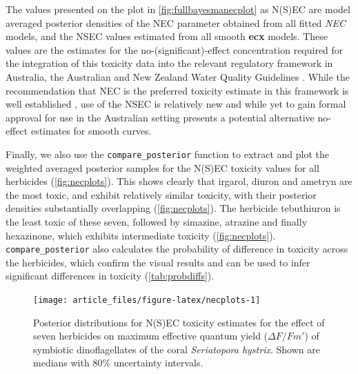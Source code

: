 \documentclass[
  shortnames]{jss}
\begin{document}
The values presented on the plot in \autoref{fig:fullbayesmanecplot} as N(S)EC are model averaged posterior densities of the NEC parameter obtained from all fitted \emph{NEC} models, and the NSEC values estimated from all smooth \textbf{ecx} models. These values are the  estimates for the no-(significant)-effect concentration required for the integration of this toxicity data into the relevant regulatory framework in Australia, the Australian and New Zealand Water Quality Guidelines \citep{anzg}. While the recommendation that NEC is the preferred toxicity estimate in this framework is well established \citep[\citet{Warne2018c}]{Warne2015}, use of the NSEC is relatively new \citep{Fisher2023} and while yet to gain formal approval for use in the Australian setting presents a potential alternative no-effect estimates for smooth curves.

Finally, we also use the \texttt{compare\_posterior} function to extract and plot the weighted averaged posterior samples for the N(S)EC toxicity values for all herbicides (\autoref{fig:necplots}). This shows clearly that irgarol, diuron and ametryn are the most toxic, and exhibit relatively similar toxicity, with their posterior densities substantially overlapping (\autoref{fig:necplots}). The herbicide tebuthiuron is the least toxic of these seven, followed by simazine, atrazine and finally hexazinone, which exhibits intermediate toxicity (\autoref{fig:necplots}). \texttt{compare\_posterior} also calculates the probability of difference in toxicity across the herbicides, which confirm the visual results and can be used to infer significant differences in toxicity (\autoref{tab:probdiffs}).

\begin{CodeChunk}
\end{CodeChunk}

\begin{CodeChunk}
\begin{figure}[!ht]

{\centering \texttt{[image: article\_files/figure-latex/necplots-1]} 

}

\caption[Posterior distributions for N(S)EC toxicity estimates for the effect of seven herbicides on maximum effective quantum yield ($\Delta F / Fm'$) of symbiotic dinoflagellates of the coral \textit{Seriatopora hystrix}]{Posterior distributions for N(S)EC toxicity estimates for the effect of seven herbicides on maximum effective quantum yield ($\Delta F / Fm'$) of symbiotic dinoflagellates of the coral \textit{Seriatopora hystrix}. Shown are medians with 80\%  uncertainty intervals.}\label{fig:necplots}
\end{figure}
\end{CodeChunk}
\end{document}

